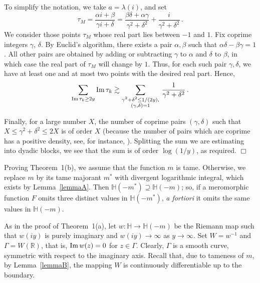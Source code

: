 \documentclass[12pt]{paper}
\newcommand{\bR}{\mathbb R}
\newcommand{\bH}{\mathbb H}
\newcommand{\im}{{\rm Im}\,}
\begin{document}
To simplify the notation, we take $a=\lambda (i)$, and set
\[
\tau_M = \frac{\alpha i + \beta}{\gamma i + \delta} 
= \frac{\beta \delta + \alpha \gamma}{\gamma^2 + \delta^2} + \frac{i}{\gamma^2 + \delta^2}\,.
\]
We consider those points $\tau_M$ whose real part lies between $-1$ and $1$. Fix coprime integers $\gamma$,
$\delta$. By Euclid’s algorithm, there exists a pair $\alpha, \beta$ such that $\alpha \delta - \beta \gamma =1$. All
other pairs are obtained by adding or subtracting $\gamma$ to $\alpha$ and $\delta$ to $\beta$, in which
case the real part of $\tau_M$ will change by $1$. Thus, for each such pair $\gamma, \delta$, we have at least one 
and at most two points with the desired real part.  Hence,
\[
\sum_{{\rm Im\,}\tau_k \ge 2y} {\rm Im\,}\tau_k  \gtrsim 
\sum_{\substack { \gamma^2 + \delta^2 \le 1/(2y), \\ (\gamma, \delta)=1}}\,
\frac1{\gamma^2+\delta^2}\,.
\]

Finally, for a large number $X$, the number of coprime pairs 
$(\gamma, \delta)$ such that $X \le \gamma^2 + \delta^2 \le 2X$ is of order $X$ (because 
the number of pairs which are coprime has a positive density, see, for instance, \cite[Theorem~ 332]{HW}). 
Splitting the sum we are estimating into
dyadic blocks, we see that the sum is of order $\log (1/y)$, as required. \hfill $\Box$  
\fi

\medskip 
Proving Theorem~1(b), we assume that the function $m$ is tame. Otherwise, we replace $m$ by its tame majorant 
$m^*$ with divergent logarithmic integral, which exists by Lemma~\ref{lemmaA}. 
Then $\bH(-m^*)\supseteq \bH(-m)$; so, if a meromorphic 
function $F$ omits  three distinct values in $\bH(-m^*)$, {\em a fortiori} it omits the same values in $\bH(-m)$.

As in the proof of Theorem~1(a), let $w\colon \bH \to \bH(-m)$ be the Riemann map such that
$w(iy)$ is purely imaginary and  $w(iy)\to \infty$ as $y\to\infty$. Set $W=w^{-1}$ and
$\Gamma = W (\bR)$, that is, $\im w(z) = 0$ for $z\in \Gamma$. Clearly, $\Gamma$ is a smooth curve, symmetric
with respect to the imaginary axis. Recall that, due to tameness of $m$, by Lemma~\ref{lemmaB},
the mapping $W$ is continuously differentiable up to the boundary.
\end{document}
